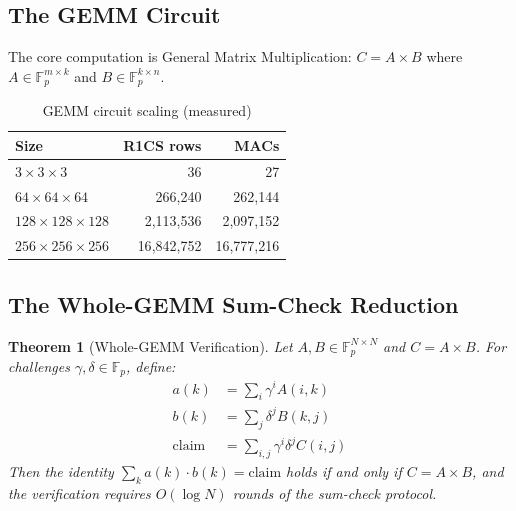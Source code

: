 \documentclass[11pt, a4paper]{article}
\theoremstyle{plain}
\newtheorem{theorem}{Theorem}
\theoremstyle{definition}
\theoremstyle{remark}
\newcommand{\fieldp}{\mathbb{F}_p}
\begin{document}
\subsection{The GEMM Circuit}

The core computation is General Matrix Multiplication:
 $C = A \times B$ where $A \in \fieldp^{m \times k}$ and
 $B \in \fieldp^{k \times n}$.

\begin{table}[h]
\centering
{}
\begin{tabular}{lrr}
\rowcolor{hsmaBlue!20} \textbf{Size} & \textbf{R1CS rows} & \textbf{MACs} \\
\midrule
 $3 \times 3 \times 3$ & 36 & 27 \\
 $64 \times 64 \times 64$ & 266{,}240 & 262{,}144 \\
 $128 \times 128 \times 128$ & 2{,}113{,}536 & 2{,}097{,}152 \\
 $256 \times 256 \times 256$ & 16{,}842{,}752 & 16{,}777{,}216 \\
\bottomrule
\end{tabular}
\caption{GEMM circuit scaling (measured)}
\end{table}

\subsection{The Whole-GEMM Sum-Check Reduction}

\begin{theorem}[Whole-GEMM Verification]
\label{thm:whole-gemm}
Let $A, B \in \fieldp^{N \times N}$ and $C = A \times B$. For
challenges $\gamma, \delta \in \fieldp$, define:
\begin{align}
a(k) &= \textstyle\sum_i \gamma^i A(i,k) \label{eq:ak}\\
b(k) &= \textstyle\sum_j \delta^j B(k,j) \label{eq:bk}\\
\text{claim} &= \textstyle\sum_{i,j} \gamma^i \delta^j C(i,j)
\label{eq:claim}
\end{align}
Then the identity $\sum_k a(k) \cdot b(k) = \text{claim}$ holds if
and only if $C = A \times B$, and the verification requires
 $O(\log N)$ rounds of the sum-check protocol.
\end{theorem}
\end{document}
